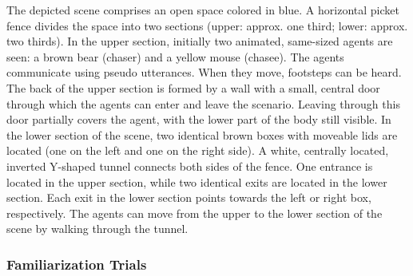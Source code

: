 \documentclass[
  english,
  man, donotrepeattitle,floatsintext]{apa6}
\begin{document}
The depicted scene comprises an open space colored in blue. A horizontal picket fence divides the space into two sections (upper: approx. one third; lower: approx. two thirds). In the upper section, initially two animated, same-sized agents are seen: a brown bear (chaser) and a yellow mouse (chasee). The agents communicate using pseudo utterances. When they move, footsteps can be heard. The back of the upper section is formed by a wall with a small, central door through which the agents can enter and leave the scenario. Leaving through this door partially covers the agent, with the lower part of the body still visible. In the lower section of the scene, two identical brown boxes with moveable lids are located (one on the left and one on the right side). A white, centrally located, inverted Y-shaped tunnel connects both sides of the fence. One entrance is located in the upper section, while two identical exits are located in the lower section. Each exit in the lower section points towards the left or right box, respectively. The agents can move from the upper to the lower section of the scene by walking through the tunnel.

\hypertarget{familiarization-trials}{%
\subsubsection{Familiarization Trials}\label{familiarization-trials}}
\end{document}
